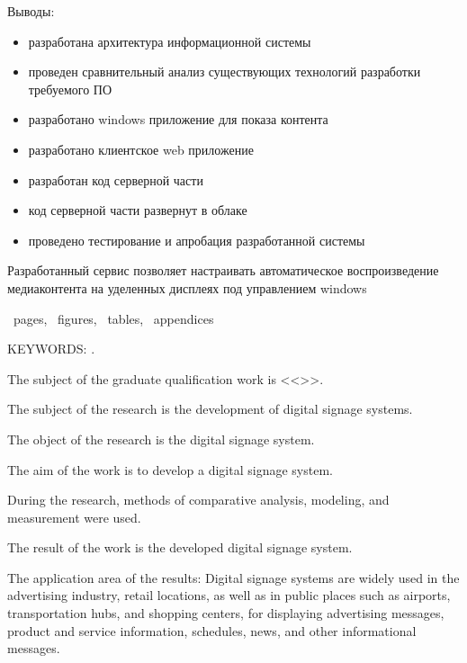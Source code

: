 Выводы:
\begin{itemize}
    \item разработана архитектура информационной системы
    \item проведен сравнительный анализ существующих технологий разработки требуемого ПО
    \item разработано windows приложение для показа контента
    \item разработано клиентское web приложение
    \item разработан код серверной части
    \item код серверной части развернут в облаке
    \item проведено тестирование и апробация разработанной системы
\end{itemize}
Разработанный сервис позволяет настраивать автоматическое воспроизведение медиаконтента на уделенных дисплеях под управлением windows




\printTheAbstract %


~pages, 
~figures, 
~tables,
~appendices%

{\MakeUppercase{Keywords: \keywordsEn}.} %
	
The subject of the graduate qualification work is <<\thesisTitleEn>>.
	
	
\abstractEn %

The subject of the research is the development of digital signage systems.

The object of the research is the digital signage system.

The aim of the work is to develop a digital signage system.

During the research, methods of comparative analysis, modeling, and measurement were used.

The result of the work is the developed digital signage system.

The application area of the results: Digital signage systems are widely used in the advertising industry, retail locations, as well as in public places such as airports, transportation hubs, and shopping centers, for displaying advertising messages, product and service information, schedules, news, and other informational messages.

